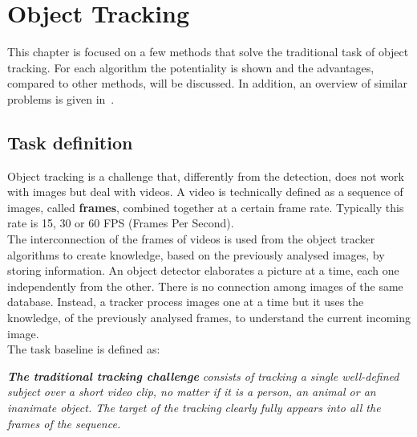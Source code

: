\chapter{Object Tracking} \label{cha:tracking}
This chapter is focused on a few methods that solve the traditional task of object tracking. For each algorithm the potentiality is shown and the advantages, compared to other methods, will be discussed. In addition, an overview of similar problems is given in~.



\section{Task definition} \label{sec:tracking-definition}
Object tracking is a challenge that, differently from the detection, does not work with images but deal with videos. A video is technically defined as a sequence of images, called \textbf{frames}, combined together at a certain frame rate. Typically this rate is 15, 30 or 60 FPS (Frames Per Second).\\
The interconnection of the frames of videos is used from the object tracker algorithms to create knowledge, based on the previously analysed images, by storing information. An object detector elaborates a picture at a time, each one independently from the other. There is no connection among images of the same database. Instead, a tracker process images one at a time but it uses the knowledge, of the previously analysed frames, to understand the current incoming image.\\
The task baseline is defined as:
\begin{tcolorbox}
	\begin{center}
		\textit{\textbf{The traditional tracking challenge} consists of tracking a single well-defined subject over a short video clip, no matter if it is a person, an animal or an inanimate object. The target of the tracking clearly fully appears into all the frames of the sequence.}
	\end{center}
\end{tcolorbox}


